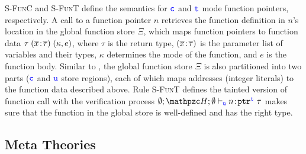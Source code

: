 \textsc{S-FunC} and \textsc{S-FunT} define the semantics
for $\textcolor{blue}{\texttt{c}}$ and $\textcolor{blue}{\texttt{t}}$ mode function pointers, respectively. 
A call to a function pointer $n$ retrieves
 the function definition in $n$'s location in the global function store $\Xi$,
which maps function pointers to
function data $\tau\;({\overline{x}}\!:\!{\overline{\tau}})\;(\kappa,e)$, where
$\tau$ is the return type, $({\overline{x}}\!:\!{\overline{\tau}})$
is the parameter list of variables and their types, 
$\kappa$ determines the mode of the function, and $e$ is the
function body. 
Similar to \heap, the global function store $\Xi$ is also partitioned into
two parts ($\textcolor{blue}{\texttt{c}}$ and $\textcolor{blue}{\texttt{u}}$ store regions), each of which
maps addresses (integer literals) to the function data described above.
Rule \textsc{S-FunT} defines the tainted version of function call
with the verification process 
$\emptyset;\heap ; \emptyset \vdash_{\umode}\evalue{n}{\tptr{\tau}{\tmode}}$
makes sure that the function in the global store is well-defined and has the right type.

\subsection{Meta Theories}\label{sec:theorem}

